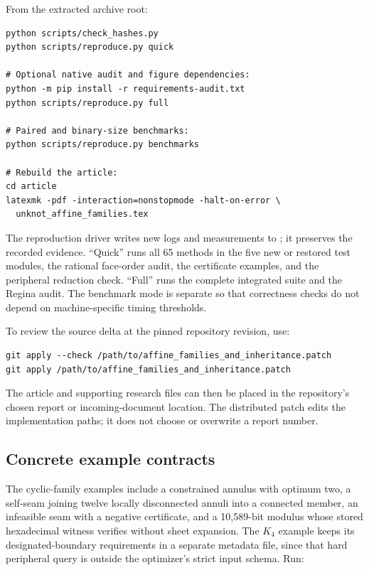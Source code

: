 \noindent\begin{minipage}{\linewidth}
From the extracted archive root:

\begin{lstlisting}
python scripts/check_hashes.py
python scripts/reproduce.py quick

# Optional native audit and figure dependencies:
python -m pip install -r requirements-audit.txt
python scripts/reproduce.py full

# Paired and binary-size benchmarks:
python scripts/reproduce.py benchmarks

# Rebuild the article:
cd article
latexmk -pdf -interaction=nonstopmode -halt-on-error \
  unknot_affine_families.tex
\end{lstlisting}
\end{minipage}

The reproduction driver writes new logs and measurements to
; it preserves the recorded evidence. ``Quick'' runs
all 65 methods in the five new or restored test modules, the rational
face-order audit, the certificate examples, and the peripheral reduction
check. ``Full'' runs the complete integrated suite and the Regina audit.
The benchmark mode is separate so that correctness checks do not depend
on machine-specific timing thresholds.

To review the source delta at the pinned repository revision, use:

\begin{lstlisting}
git apply --check /path/to/affine_families_and_inheritance.patch
git apply /path/to/affine_families_and_inheritance.patch
\end{lstlisting}

The article and supporting research files can then be placed in the
repository's chosen report or incoming-document location. The distributed
patch edits the implementation paths; it does not choose or overwrite a
report number.

\subsection{Concrete example contracts}

The cyclic-family examples include a constrained annulus with optimum two,
a self-seam joining twelve locally disconnected annuli into a connected
member, an infeasible seam with a negative certificate, and a 10,589-bit
modulus whose stored hexadecimal witness verifies without sheet expansion.
The $K_4$ example keeps its designated-boundary requirements in a separate
metadata file, since that hard peripheral query is outside the optimizer's
strict input schema. Run:

